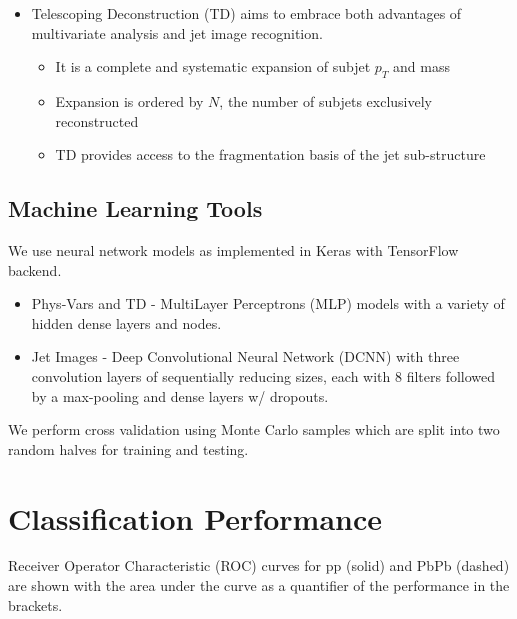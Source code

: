 \documentclass[final]{beamer}
\begin{document}
\begin{frame}[t]
\begin{multicols}{3}
	\begin{itemize}
	\item {\color{red} Telescoping Deconstruction} (TD) aims to embrace both advantages of multivariate analysis and jet image recognition. 
	\begin{itemize}
	\item It is a complete and systematic expansion of subjet $p_T$ and mass
	\item Expansion is ordered by $N$, the number of subjets exclusively reconstructed
	\item TD provides access to the fragmentation basis of the jet sub-structure
	\end{itemize}
	\end{itemize}
	
\subsection{Machine Learning Tools}
We use neural network models as implemented in Keras with TensorFlow backend. 
	\begin{itemize}
	\item Phys-Vars and TD - MultiLayer Perceptrons (MLP) models with a variety of hidden dense layers and nodes.  
	\item Jet Images - Deep Convolutional Neural Network (DCNN) with three convolution layers of sequentially reducing sizes, each with 8 filters followed by a max-pooling and dense layers w/ dropouts. 
	\end{itemize}
	We perform cross validation using Monte Carlo samples which are split into two random halves for training and testing.

\section{Classification Performance}

	Receiver Operator Characteristic (ROC) curves for pp (solid) and PbPb (dashed) are shown with the area under the curve as a quantifier of the performance in the brackets.  
	

\end{multicols}
\end{frame}
\end{document}
